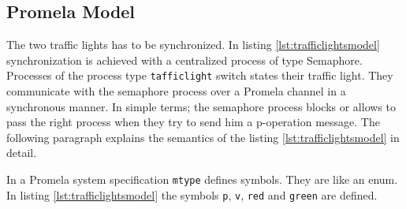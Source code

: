 \documentclass[12pt,a4paper,twoside]{article}
\begin{document}
\subsection{Promela Model}
\label{sec:trafficlightsmodel}



The two traffic lights has to be synchronized. In listing \ref{lst:trafficlightsmodel} synchronization is achieved with a centralized process of type Semaphore. Processes of the process type \texttt{tafficlight} switch states their traffic light. They communicate with the semaphore process over a Promela channel in a synchronous manner. In simple terms; the semaphore process blocks or allows to pass the right process when they try to send him a p-operation message. The following paragraph explains the semantics of the listing \ref{lst:trafficlightsmodel} in detail. 

In a Promela system specification \texttt{mtype} defines symbols. They are like an enum. In listing \ref{lst:trafficlightsmodel} the symbols \texttt{p}, \texttt{v}, \texttt{red} and \texttt{green} are defined.
\end{document}
